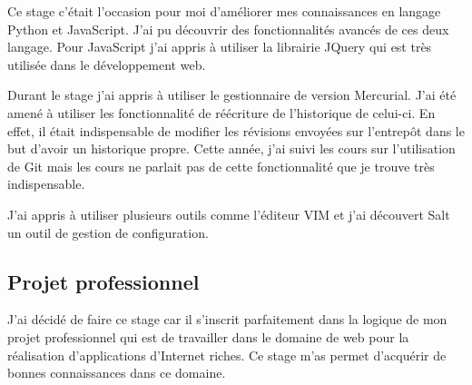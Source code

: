 Ce stage c'était l'occasion pour moi d'améliorer mes connaissances en langage Python et JavaScript. J'ai pu découvrir des fonctionnalités avancés de ces deux langage. Pour JavaScript j'ai appris à utiliser la librairie JQuery qui est très utilisée dans le développement web. 

Durant le stage j'ai appris à utiliser le gestionnaire de version Mercurial. J'ai été amené à utiliser les fonctionnalité de réécriture de l'historique de celui-ci. En effet, il était indispensable de modifier les révisions envoyées sur l'entrepôt dans le but d'avoir un historique propre. Cette année, j'ai suivi les cours sur l'utilisation de Git mais les cours ne parlait pas de cette fonctionnalité que je trouve très indispensable. 

J'ai appris à utiliser plusieurs outils comme l'éditeur VIM et j'ai découvert Salt un outil de gestion de configuration. 
\subsection{Projet professionnel}
J'ai décidé de faire ce stage car il s'inscrit parfaitement dans la logique de mon projet professionnel qui est de travailler dans le domaine de web pour la réalisation d'applications d'Internet riches. Ce stage m'as permet d'acquérir de bonnes connaissances dans ce domaine.  
